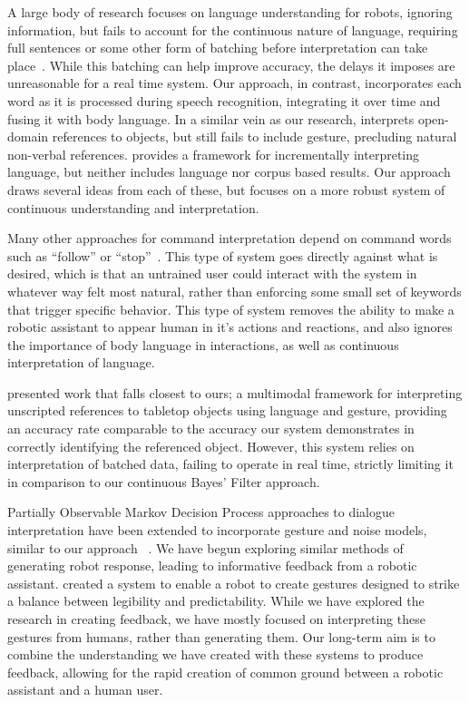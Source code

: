 \documentclass[a4paper, 11pt]{article} %
\begin{document}
A large body of research focuses on language understanding for robots, ignoring information, but fails to account for the continuous nature of language, requiring full sentences or some other form of batching before interpretation can take place~\citep{macmahon06, dzifcak09, kollar10, matuszek12}. While this batching can help improve accuracy, the delays it imposes are unreasonable for a real time system. Our approach, in contrast, incorporates each word as it is processed during speech recognition, integrating it over time and fusing it with body language. In a similar vein as our research, \citet{guadarrama14} interprets open-domain references to objects, but still fails to include gesture, precluding natural non-verbal references. \citet{cantrell10} provides a framework for incrementally interpreting language, but neither includes language nor corpus based results. Our approach draws several ideas from each of these, but focuses on a more robust system of continuous understanding and interpretation.

Many other approaches for command interpretation depend on command words such as ``follow'' or ``stop''~\citep{waldherr00, marge11}. This type of system goes directly against what is desired, which is that an untrained user could interact with the system in whatever way felt most natural, rather than enforcing some small set of keywords that trigger specific behavior. This type of system removes the ability to make a robotic assistant to appear human in it's actions and reactions, and also ignores the importance of body language in interactions, as well as continuous interpretation of language.

\citet{matuszek14} presented work that falls closest to ours; a multimodal framework for interpreting unscripted references to tabletop objects using language and gesture, providing an accuracy rate comparable to the accuracy our system demonstrates in correctly identifying the referenced object. However, this system relies on interpretation of batched data, failing to operate in real time, strictly limiting it in comparison to our continuous Bayes' Filter approach.

Partially Observable Markov Decision Process approaches to dialogue interpretation have been extended to incorporate gesture and noise models, similar to our approach~\citep{young13, young10} . We have begun exploring similar methods of generating robot response, leading to informative feedback from a robotic assistant. \citet{dragan13} created a system to enable a robot to create gestures designed to strike a balance between legibility and predictability. While we have explored the research in creating feedback, we have mostly focused on interpreting these gestures from humans, rather than generating them. Our long-term aim is to combine the understanding we have created with these systems to produce feedback, allowing for the rapid creation of common ground between a robotic assistant and a human user.
\end{document}
